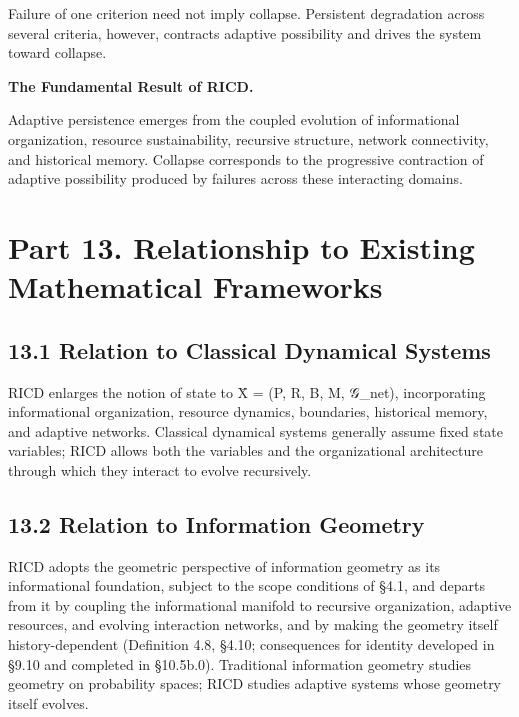 \documentclass[
]{article}
\begin{document}
Failure of one criterion need not imply collapse. Persistent degradation
across several criteria, however, contracts adaptive possibility and
drives the system toward collapse.

\textbf{The Fundamental Result of RICD.}

Adaptive persistence emerges from the coupled evolution of informational
organization, resource sustainability, recursive structure, network
connectivity, and historical memory. Collapse corresponds to the
progressive contraction of adaptive possibility produced by failures
across these interacting domains.

\hypertarget{part-13.-relationship-to-existing-mathematical-frameworks}{%
\section{Part 13. Relationship to Existing Mathematical
Frameworks}\label{part-13.-relationship-to-existing-mathematical-frameworks}}

\hypertarget{relation-to-classical-dynamical-systems}{%
\subsection{13.1 Relation to Classical Dynamical
Systems}\label{relation-to-classical-dynamical-systems}}

RICD enlarges the notion of state to X̄ = (P, R, B, M, 𝒢\_net),
incorporating informational organization, resource dynamics, boundaries,
historical memory, and adaptive networks. Classical dynamical systems
generally assume fixed state variables; RICD allows both the variables
and the organizational architecture through which they interact to
evolve recursively.

\hypertarget{relation-to-information-geometry}{%
\subsection{13.2 Relation to Information
Geometry}\label{relation-to-information-geometry}}

RICD adopts the geometric perspective of information geometry as its
informational foundation, subject to the scope conditions of §4.1, and
departs from it by coupling the informational manifold to recursive
organization, adaptive resources, and evolving interaction networks, and
by making the geometry itself history-dependent (Definition 4.8, §4.10;
consequences for identity developed in §9.10 and completed in §10.5b.0).
Traditional information geometry studies geometry on probability spaces;
RICD studies adaptive systems whose geometry itself evolves.
\end{document}
